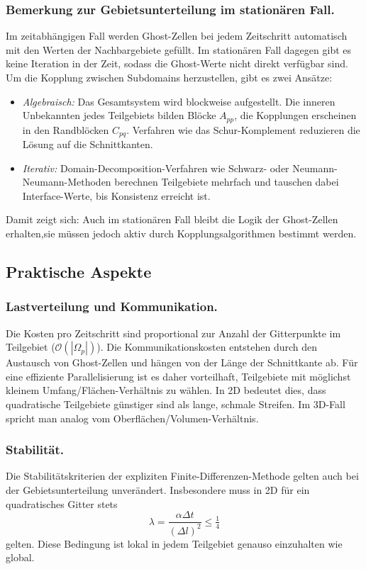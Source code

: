 \subsubsection*{Bemerkung zur Gebietsunterteilung im stationären Fall.}  
Im zeitabhängigen Fall werden Ghost-Zellen bei jedem Zeitschritt automatisch mit den Werten der Nachbargebiete gefüllt.  
Im stationären Fall dagegen gibt es keine Iteration in der Zeit, sodass die Ghost-Werte nicht direkt verfügbar sind.  
Um die Kopplung zwischen Subdomains herzustellen, gibt es zwei Ansätze:
\begin{itemize}
	\item \emph{Algebraisch:} Das Gesamtsystem wird blockweise aufgestellt. Die inneren Unbekannten jedes Teilgebiets bilden Blöcke $A_{pp}$, die Kopplungen erscheinen in den Randblöcken $C_{pq}$. Verfahren wie das Schur-Komplement reduzieren die Lösung auf die Schnittkanten.
	\item \emph{Iterativ:} Domain-Decomposition-Verfahren wie Schwarz- oder Neumann-Neumann-Methoden berechnen Teilgebiete mehrfach und tauschen dabei Interface-Werte, bis Konsistenz erreicht ist.
\end{itemize}
Damit zeigt sich: Auch im stationären Fall bleibt die Logik der Ghost-Zellen erhalten,sie müssen jedoch aktiv durch Kopplungsalgorithmen bestimmt werden.


\subsection{Praktische Aspekte}

\subsubsection {Lastverteilung und Kommunikation.}
Die Kosten pro Zeitschritt sind proportional zur Anzahl der Gitterpunkte im Teilgebiet 
($\mathcal{O}(|\Omega_p|)$).  
Die Kommunikationskosten entstehen durch den Austausch von Ghost-Zellen und hängen von der Länge der Schnittkante ab.  
Für eine effiziente Parallelisierung ist es daher vorteilhaft, Teilgebiete mit möglichst kleinem 
Umfang/Flächen-Verhältnis zu wählen.  
In 2D bedeutet dies, dass quadratische Teilgebiete günstiger sind als lange, schmale Streifen.
Im 3D-Fall spricht man analog vom Oberflächen/Volumen-Verhältnis.  

\subsubsection {Stabilität.}
Die Stabilitätskriterien der expliziten Finite-Differenzen-Methode gelten auch bei der Gebietsunterteilung unverändert.  
Insbesondere muss in 2D für ein quadratisches Gitter stets
\[
\lambda = \frac{\alpha \Delta t}{(\Delta l)^2} \leq \tfrac{1}{4}
\]
gelten.  
Diese Bedingung ist lokal in jedem Teilgebiet genauso einzuhalten wie global.  



